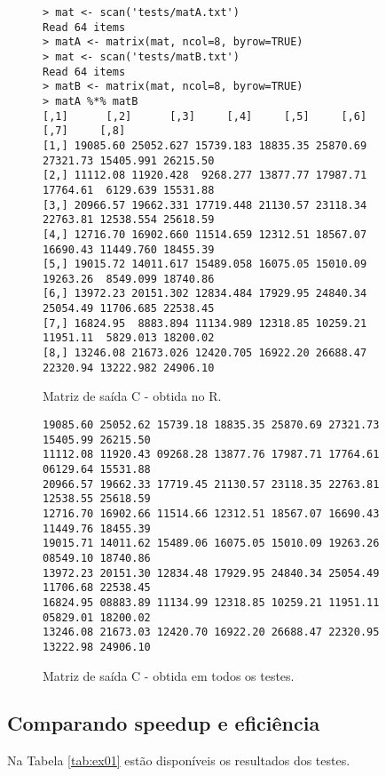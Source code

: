 \documentclass[conference]{IEEEtran}
\begin{document}
\begin{figure}[htb!]
\begin{adjustbox}{max width=\linewidth}
\begin{BVerbatim}
> mat <- scan('tests/matA.txt')
Read 64 items
> matA <- matrix(mat, ncol=8, byrow=TRUE)
> mat <- scan('tests/matB.txt')
Read 64 items
> matB <- matrix(mat, ncol=8, byrow=TRUE)
> matA %
[,1]      [,2]      [,3]     [,4]     [,5]     [,6]      [,7]     [,8]
[1,] 19085.60 25052.627 15739.183 18835.35 25870.69 27321.73 15405.991 26215.50
[2,] 11112.08 11920.428  9268.277 13877.77 17987.71 17764.61  6129.639 15531.88
[3,] 20966.57 19662.331 17719.448 21130.57 23118.34 22763.81 12538.554 25618.59
[4,] 12716.70 16902.660 11514.659 12312.51 18567.07 16690.43 11449.760 18455.39
[5,] 19015.72 14011.617 15489.058 16075.05 15010.09 19263.26  8549.099 18740.86
[6,] 13972.23 20151.302 12834.484 17929.95 24840.34 25054.49 11706.685 22538.45
[7,] 16824.95  8883.894 11134.989 12318.85 10259.21 11951.11  5829.013 18200.02
[8,] 13246.08 21673.026 12420.705 16922.20 26688.47 22320.94 13222.982 24906.10
\end{BVerbatim}
\end{adjustbox}
\caption{Matriz de saída C - obtida no R. \label{fig:matC-R}}
\end{figure}

\begin{figure}[htb!]
	\begin{adjustbox}{max width=\linewidth}
		\begin{BVerbatim}
19085.60 25052.62 15739.18 18835.35 25870.69 27321.73 15405.99 26215.50 
11112.08 11920.43 09268.28 13877.76 17987.71 17764.61 06129.64 15531.88 
20966.57 19662.33 17719.45 21130.57 23118.35 22763.81 12538.55 25618.59 
12716.70 16902.66 11514.66 12312.51 18567.07 16690.43 11449.76 18455.39 
19015.71 14011.62 15489.06 16075.05 15010.09 19263.26 08549.10 18740.86 
13972.23 20151.30 12834.48 17929.95 24840.34 25054.49 11706.68 22538.45 
16824.95 08883.89 11134.99 12318.85 10259.21 11951.11 05829.01 18200.02 
13246.08 21673.03 12420.70 16922.20 26688.47 22320.95 13222.98 24906.10 
		\end{BVerbatim}
	\end{adjustbox}
	\caption{Matriz de saída C - obtida em todos os testes. \label{fig:matC}}
\end{figure}
\subsection{Comparando speedup e eficiência}
Na Tabela \ref{tab:ex01} estão disponíveis os resultados dos testes.
\end{document}
